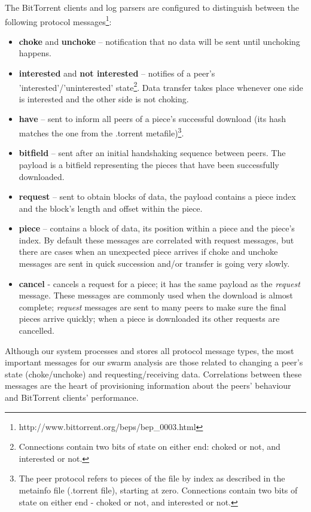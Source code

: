 The BitTorrent clients and log parsers are configured to distinguish between
the following protocol
messages\footnote{http://www.bittorrent.org/beps/bep\_0003.html}:
\begin{itemize}
  \item \textbf{choke} and \textbf{unchoke} -- notification that no data will
be sent until unchoking happens.
  \item \textbf{interested} and \textbf{not interested} -- notifies of a peer's
'interested'/'uninterested' state\footnote{Connections contain two bits of
state on either end: choked or not, and interested or not.}. Data transfer
takes place whenever one side is interested and the other side is not choking.
  \item \textbf{have} -- sent to inform all peers of a piece's successful
download (its hash matches the one from the .torrent metafile)\footnote{The
peer protocol refers to pieces of the file by index as described in the
metainfo file (.torrent file), starting at zero. Connections contain two bits
of state on either end - choked or not, and interested or not.}.
  \item \textbf{bitfield} -- sent after an initial handshaking sequence between
peers. The payload is a bitfield representing the pieces that have been
successfully downloaded.
  \item \textbf{request} -- sent to obtain blocks of data, the payload
contains a piece index and the block's length and offset within the piece.
  \item \textbf{piece} -- contains a block of data, its position within a piece
and the piece's index. By default these messages are correlated with request
messages, but there are cases when an unexpected piece arrives if choke and
unchoke messages are sent in quick succession and/or transfer is going very
slowly.
  \item \textbf{cancel} - cancels a request for a piece; it has the same
payload as the \textit{request} message. These messages are commonly used when
the download is almost complete; \textit{request} messages are sent to many
peers to make sure the final pieces arrive quickly; when a piece is
downloaded its other requests are cancelled.
\end{itemize}

Although our system processes and stores all protocol message types,
the most important messages for our swarm analysis are those related to
changing a peer's state (choke/unchoke) and requesting/receiving data.
Correlations between these messages are the heart of provisioning information
about the peers' behaviour and BitTorrent clients' performance.

